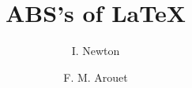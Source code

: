 \documentclass[acmsmall,screen,natbib=false]{acmart}
\title{ABS's of LaTeX}
\author{I. Newton}
\affiliation{%
  \institution{Royal Mint}%
  \city{London}%
  \country{United Kingdom}%
}
\author{F. M. Arouet}
\affiliation{%
  \institution{Bastille Saint-Antoine}%
  \city{Paris}%
  \country{France}%
}
\begin{document}
%

\maketitle






\printbibliography{}
\end{document}

